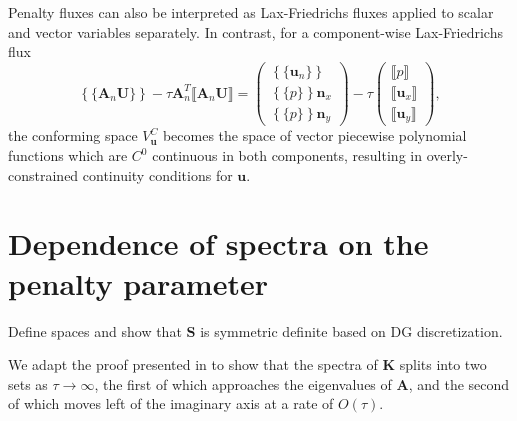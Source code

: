\documentclass[10pt]{article}
\newcommand{\LRc}[1]{\left\{ #1 \right\}}
\newcommand{\jump}[1] {\ensuremath{\llbracket#1\rrbracket}}
\newcommand{\avg}[1] {\ensuremath{\LRc{\!\{#1\}\!}}}
\newcommand{\note}[1]{{\color{blue}#1}}
\begin{document}
Penalty fluxes can also be interpreted as Lax-Friedrichs fluxes applied to scalar and vector variables separately.  In contrast, for a component-wise Lax-Friedrichs flux 
\[
\avg{\bm{A}_n \bm{U}} - \tau\bm{A}_n^T \jump{\bm{A}_n\bm{U}} = \left(\begin{array}{c}
\avg{\bm{u}_n}\\
\avg{p }\bm{n}_x\\
\avg{p }\bm{n}_y
\end{array}
\right) - 
\tau\left(\begin{array}{c}
\jump{p}\\
\jump{\bm{u}_x}\\
\jump{\bm{u}_y}
\end{array}
\right),
\]
the conforming space $V^C_{\bm{u}}$ becomes the space of vector piecewise polynomial functions which are $C^0$ continuous in both components, resulting in overly-constrained continuity conditions for $\bm{u}$.  


\section{Dependence of spectra on the penalty parameter}

\note{Define spaces and show that $\bm{S}$ is symmetric definite based on DG discretization.}  

We adapt the proof presented in \cite{Warburton20063205} to show that the spectra of $\bm{K}$ splits into two sets as $\tau\rightarrow \infty$, the first of which approaches the eigenvalues of $\bm{A}$, and the second of which moves left of the imaginary axis at a rate of $O(\tau)$.  
\end{document}
